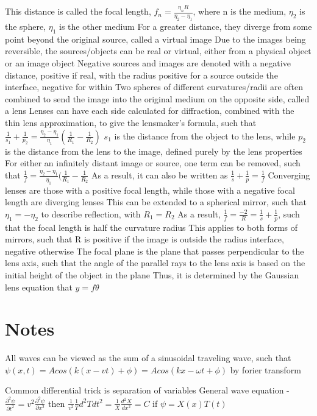 \documentclass[11 pt, twoside]{article}
\newenvironment{outline*}
{
	\begin{outline}[enumerate]
	}
	{\end{outline}
}
\begin{document}
\begin{outline*}
\4 This distance is called the focal length, $f_n = \frac{\eta_{n}R}{\eta_2 - \eta_1}$, where n is the medium, $\eta_2$ is the sphere, $\eta_1$ is the other medium
\3 For a greater distance, they diverge from some point beyond the original source, called a virtual image
\3 Due to the images being reversible, the sources/objects can be real or virtual, either from a physical object or an image object
\3 Negative sources and images are denoted with a negative distance, positive if real, with the radius positive for a source outside the interface, negative for within
\1 Two spheres of different curvatures/radii are often combined to send the image into the original medium on the opposite side, called a lens
\2 Lenses can have each side calculated for diffraction, combined with the thin lens approximation, to give the lensmaker's formula, such that $\frac{1}{s_1} + \frac{1}{p_2} = \frac{\eta_2 - \eta_1}{\eta_1}(\frac{1}{R_1} - \frac{1}{R_2})$
\3 $s_1$ is the distance from the object to the lens, while $p_2$ is the distance from the lens to the image, defined purely by the lens properties
\3 For either an infinitely distant image or source, one term can be removed, such that $\frac{1}{f} = \frac{\eta_2 - \eta_1}{\eta_1}(\frac{1}{R_1} - \frac{1}{R_2}$
\3 As a result, it can also be written as $\frac{1}{s} + \frac{1}{p} = \frac{1}{f}$
\2 Converging lenses are those with a positive focal length, while those with a negative focal length are diverging lenses
\2 This can be extended to a spherical mirror, such that $\eta_1 = -\eta_2$ to describe reflection, with $R_1 = R_2$
\3 As a result, $\frac{1}{f} = \frac{-2}{R} = \frac{1}{s} + \frac{1}{p}$, such that the focal length is half the curvature radius
\3 This applies to both forms of mirrors, such that R is positive if the image is outside the radius interface, negative otherwise
\1 The focal plane is the plane that passes perpendicular to the lens axis, such that the angle of the parallel rays to the lens axis is based on the initial height of the object in the plane
\2 Thus, it is determined by the Gaussian lens equation that $y = f\theta$
\end{outline*}
\section{Notes}
All waves can be viewed as the sum of a sinusoidal traveling wave, such that $\psi(x, t) = Acos(k(x-vt) + \phi) = Acos(kx - \omega t + \phi)$ by forier transform

Common differential trick is separation of variables
General wave equation - 
$\frac{\partial^2 \psi}{\partial t^2} = v^2\frac{\partial^2 \psi}{\partial x^2}$ then $\frac{1}{v^2}\frac{1}{T}{d^2T}{dt^2} = \frac{1}{X}\frac{d^2X}{dx^2} = C$ if $\psi = X(x)T(t)$
\end{document}
